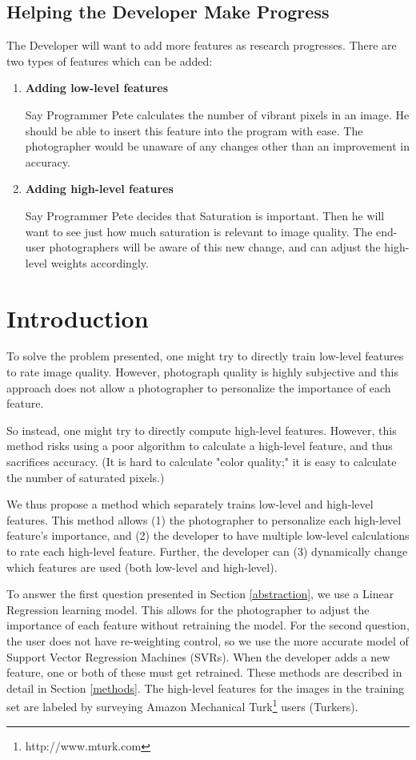 \documentclass[11pt,letter]{article}
\begin{document}
\subsection{Helping the Developer Make Progress}
\label{easeofprogramming}
The Developer will want to add more features as research progresses. There are two types of features which can be added:
\begin{enumerate}
\item \textbf{Adding low-level features}

Say Programmer Pete calculates the number of vibrant pixels in an image. He should be able to insert this feature into the program with ease. The photographer would be unaware of any changes other than an improvement in accuracy.

\item \textbf{Adding high-level features}

Say Programmer Pete decides that Saturation is important. Then he will want to see just how much saturation is relevant to image quality. The end-user photographers will be aware of this new change, and can adjust the high-level weights accordingly.
\end{enumerate}

\section{Introduction}
To solve the problem presented, one might try to directly train low-level features to rate image quality. However, photograph quality is highly subjective and this approach does not allow a photographer to personalize the importance of each feature.

So instead, one might try to directly compute high-level features. However, this method risks using a poor algorithm to calculate a high-level feature, and thus sacrifices accuracy. (It is hard to calculate "color quality;" it is easy to calculate the number of saturated pixels.)

We thus propose a method which separately trains low-level and high-level features. This method allows (1) the photographer to personalize each high-level feature's importance, and (2) the developer to have multiple low-level calculations to rate each high-level feature. Further, the developer can (3) dynamically change which features are used (both low-level and high-level).

To answer the first question presented in Section \ref{abstraction}, we use a Linear Regression learning model. This allows for the photographer to adjust the importance of each feature without retraining the model. For the second question, the user does not have re-weighting control, so we use the more accurate model of Support Vector Regression Machines (SVRs)\cite{springerlink:10.1023/B:STCO.0000035301.49549.88}. When the developer adds a new feature, one or both of these must get retrained. These methods are described in detail in Section \ref{methods}. The high-level features for the images in the training set are labeled by surveying Amazon Mechanical Turk\footnote{http://www.mturk.com} users (Turkers).
\end{document}
